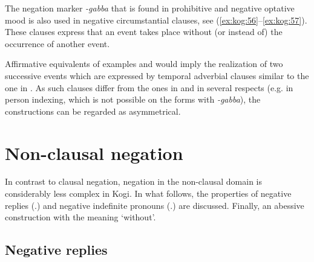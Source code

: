 \documentclass[output=paper,colorlinks,citecolor=brown]{langscibook}
\begin{document}
The negation marker \textit{{}-gabba} that is found in prohibitive and negative optative mood is also used in negative circumstantial clauses, see (\ref{ex:kog:56}--\ref{ex:kog:57}). These clauses express that an event takes place without (or instead of) the occurrence of another event.



Affirmative equivalents of examples  and  would imply the realization of two successive events which are expressed by temporal adverbial clauses similar to the one in . As such clauses differ from the ones in  and  in several respects (e.g. in person indexing, which is not possible on the forms with \textit{{}-gabba}), the constructions can be regarded as asymmetrical. 

\section{Non-clausal negation}\label{sec:kog:3}

In contrast to clausal negation, negation in the non-clausal domain is considerably less complex in Kogi. In what follows, the properties of negative replies (.) and negative indefinite pronouns (.) are discussed. Finally,  an abessive construction with the meaning ‘without’.

\subsection{Negative replies}\label{sec:kog:3.1}
\end{document}
